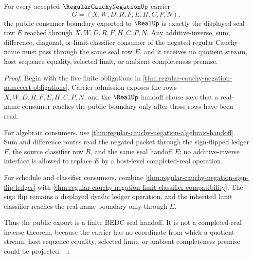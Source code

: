 \begin{theorem}
\label{thm:regular-cauchy-negation-public-seal-export}
For every accepted $\RegularCauchyNegationUp$ carrier
$$
G=(X,W,D,R,F,E,H,C,P,N),
$$
the public consumer boundary exported to $\RealUp$ is exactly the displayed seal row $E$ reached through $X,W,D,R,F,H,C,P,N$. Any additive-inverse, sum, difference, diagonal, or limit-classifier consumer of the negated regular Cauchy name must pass through the same seal row $E$, and it receives no quotient stream, host sequence equality, selected limit, or ambient completeness premise.
\end{theorem}
\begin{proof}
Begin with the five finite obligations in \autoref{thm:regular-cauchy-negation-namecert-obligations}. Carrier admission exposes the rows $X,W,D,R,F,E,H,C,P,N$, and the $\RealUp$ handoff clause says that a real-name consumer reaches the public boundary only after those rows have been read.

For algebraic consumers, use \autoref{thm:regular-cauchy-negation-algebraic-handoff}. Sum and difference routes read the negated packet through the sign-flipped ledger $F$, the source classifier row $R$, and the same seal handoff $E$; no additive-inverse interface is allowed to replace $E$ by a host-level completed-real operation.

For schedule and classifier consumers, combine \autoref{thm:regular-cauchy-negation-sign-flip-ledger} with \autoref{thm:regular-cauchy-negation-limit-classifier-compatibility}. The sign flip remains a displayed dyadic ledger operation, and the inherited limit classifier reaches the real-name boundary only through $E$.

Thus the public export is a finite BEDC seal handoff. It is not a completed-real inverse theorem, because the carrier has no coordinate from which a quotient stream, host sequence equality, selected limit, or ambient completeness premise could be projected.
\end{proof}

